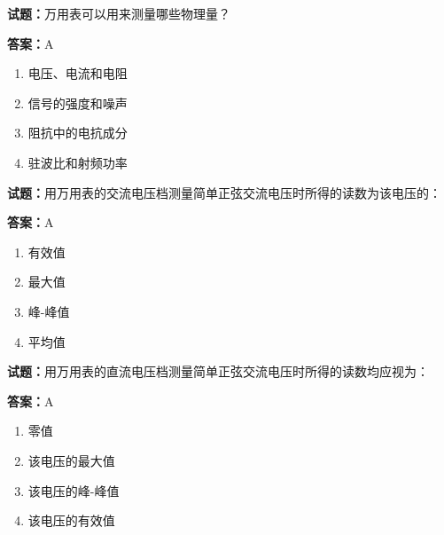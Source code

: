 \documentclass{ctexbook}
\begin{document}




\vspace{1em}

\textbf{试题：}万用表可以用来测量哪些物理量？ 

\textbf{答案：}A 

\begin{enumerate}[leftmargin=3em]
  \item 电压、电流和电阻 

  \item 信号的强度和噪声 

  \item 阻抗中的电抗成分 

  \item 驻波比和射频功率 

\end{enumerate}






\vspace{1em}

\textbf{试题：}用万用表的交流电压档测量简单正弦交流电压时所得的读数为该电压的： 

\textbf{答案：}A 

\begin{enumerate}[leftmargin=3em]
  \item 有效值 

  \item 最大值 

  \item 峰-峰值 

  \item 平均值 

\end{enumerate}





\vspace{1em}

\textbf{试题：}用万用表的直流电压档测量简单正弦交流电压时所得的读数均应视为： 

\textbf{答案：}A 

\begin{enumerate}[leftmargin=3em]
  \item 零值 

  \item 该电压的最大值 

  \item 该电压的峰-峰值 

  \item 该电压的有效值 

\end{enumerate}
\end{document}

